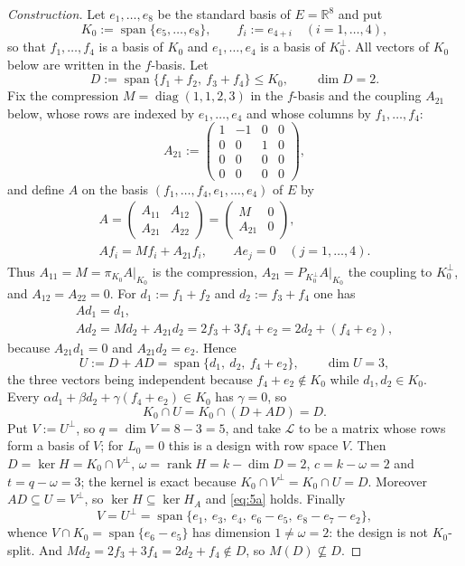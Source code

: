 \documentclass[journal]{IEEEtran}
\theoremstyle{plainn}
\theoremstyle{remark}
\newcommand{\rank}{\operatorname{rank}}
\begin{document}
\begin{proof}[Construction]
Let $e_1,\dots,e_8$ be the standard basis of $E=\mathbb R^8$ and put
\[
K_0:=\operatorname{span}\{e_5,\dots,e_8\},\qquad f_i:=e_{4+i}\quad(i=1,\dots,4),
\]
so that $f_1,\dots,f_4$ is a basis of $K_0$ and $e_1,\dots,e_4$ is a basis of $K_0^\perp$. All vectors of
$K_0$ below are written in the $f$-basis. Let
\[
D:=\operatorname{span}\{f_1+f_2,\ f_3+f_4\}\le K_0,\qquad \dim D=2 .
\]
Fix the compression $M=\operatorname{diag}(1,1,2,3)$ in the $f$-basis and the coupling $A_{21}$ below,
whose rows are indexed by $e_1,\dots,e_4$ and whose columns by $f_1,\dots,f_4$:
\[
A_{21}:=\begin{pmatrix}
1&-1&0&0\\
0&0&1&0\\
0&0&0&0\\
0&0&0&0
\end{pmatrix},
\]
and define $A$ on the basis $(f_1,\dots,f_4,e_1,\dots,e_4)$ of $E$ by
\begin{equation}\label{eq:notnormal-A}
\begin{gathered}
A=\begin{pmatrix} A_{11} & A_{12}\\ A_{21} & A_{22}\end{pmatrix}
=\begin{pmatrix} M & 0\\ A_{21} & 0\end{pmatrix},\\
Af_i=Mf_i+A_{21}f_i,\qquad Ae_j=0\quad(j=1,\dots,4).
\end{gathered}
\end{equation}
Thus $A_{11}=M=\pi_{K_0}A|_{K_0}$ is the compression, $A_{21}=P_{K_0^\perp}A|_{K_0}$ the coupling to
$K_0^\perp$, and $A_{12}=A_{22}=0$. For $d_1:=f_1+f_2$ and $d_2:=f_3+f_4$ one has
\begin{gather*}
Ad_1=d_1,\\
Ad_2=Md_2+A_{21}d_2=2f_3+3f_4+e_2=2d_2+(f_4+e_2),
\end{gather*}
because $A_{21}d_1=0$ and $A_{21}d_2=e_2$. Hence
\[
U:=D+AD=\operatorname{span}\{d_1,\ d_2,\ f_4+e_2\},\qquad \dim U=3 ,
\]
the three vectors being independent because $f_4+e_2\notin K_0$ while $d_1,d_2\in K_0$. Every
$\alpha d_1+\beta d_2+\gamma(f_4+e_2)\in K_0$ has $\gamma=0$, so
\[
K_0\cap U=K_0\cap(D+AD)=D .
\]
Put $V:=U^\perp$, so $q=\dim V=8-3=5$, and take $\mathcal L$ to be a matrix whose rows form a basis of
$V$; for $L_0=0$ this is a design with row space $V$.
Then $D=\ker H=K_0\cap V^\perp$, $\omega=\rank H=k-\dim D=2$, $c=k-\omega=2$ and $t=q-\omega=3$; the
kernel is exact because $K_0\cap V^\perp=K_0\cap U=D$. Moreover $AD\subseteq U=V^\perp$, so
$\ker H\subseteq\ker H_A$ and \eqref{eq:5a} holds. Finally
\[
V=U^\perp=\operatorname{span}\{e_1,\ e_3,\ e_4,\ e_6-e_5,\ e_8-e_7-e_2\},
\]
whence $V\cap K_0=\operatorname{span}\{e_6-e_5\}$ has dimension $1\ne\omega=2$: the design is not
$K_0$-split. And $Md_2=2f_3+3f_4=2d_2+f_4\notin D$, so $M(D)\not\subseteq D$.
\end{proof}
\end{document}
